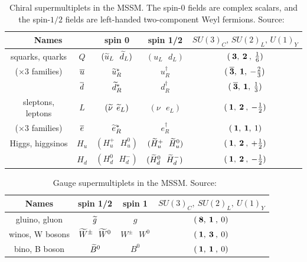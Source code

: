 \begin{table}[tb]
  \begin{center}
    \begin{tabular}{|c|c|c|c|c|}
      \hline
      \multicolumn{2}{|c|}{Names} 
      & spin 0 & spin 1/2 & $SU(3)_C ,\, SU(2)_L ,\, U(1)_Y$
      \\  \hline\hline
      squarks, quarks & $Q$ & $({\widetilde u}_L\>\>\>{\widetilde d}_L )$&
      $(u_L\>\>\>d_L)$ & $(\>{\bf 3},\>{\bf 2}\>,\>{1\over 6})$
      \\
      ($\times 3$ families) & $\overline u$
      &${\widetilde u}^*_R$ & $u^\dagger_R$ & 
      $(\>{\bf \overline 3},\> {\bf 1},\> -{2\over 3})$
      \\ & $\overline d$ &${\widetilde d}^*_R$ & $d^\dagger_R$ & 
      $(\>{\bf \overline 3},\> {\bf 1},\> {1\over 3})$
      \\  \hline
      sleptons, leptons & $L$ &$({\widetilde \nu}\>\>{\widetilde e}_L )$&
      $(\nu\>\>\>e_L)$ & $(\>{\bf 1},\>{\bf 2}\>,\>-{1\over 2})$
      \\
      ($\times 3$ families) & $\overline e$
      &${\widetilde e}^*_R$ & $e^\dagger_R$ & $(\>{\bf 1},\> {\bf 1},\>1)$
      \\  \hline
      Higgs, higgsinos &$H_u$ &$(H_u^+\>\>\>H_u^0 )$&
      $(\widetilde H_u^+ \>\>\> \widetilde H_u^0)$& 
      $(\>{\bf 1},\>{\bf 2}\>,\>+{1\over 2})$
      \\ &$H_d$ & $(H_d^0 \>\>\> H_d^-)$ & $(\widetilde H_d^0 \>\>\> \widetilde H_d^-)$& 
      $(\>{\bf 1},\>{\bf 2}\>,\>-{1\over 2})$
      \\  \hline
    \end{tabular}
    \caption[Chiral supermultiplets in the MSSM]{Chiral supermultiplets in the
    MSSM\@. The spin-$0$ fields are complex
    scalars, and the spin-$1/2$ fields are left-handed two-component Weyl
    fermions. Source:~\cite{Martin:1997um}\label{tab:chiral}} \vspace{-0.6cm}
  \end{center}
\end{table}
%
\renewcommand{\arraystretch}{1.55}
\begin{table}[t]
  \begin{center}
    \begin{tabular}{|c|c|c|c|}
      \hline
      Names & spin 1/2 & spin 1 & $SU(3)_C, \> SU(2)_L,\> U(1)_Y$\\
      \hline\hline
      gluino, gluon &$ \widetilde g$& $g$ & $(\>{\bf 8},\>{\bf 1}\>,\> 0)$
      \\
      \hline
      winos, W bosons & $ \widetilde W^\pm\>\>\> \widetilde W^0 $&
      $W^\pm\>\>\> W^0$ & $(\>{\bf 1},\>{\bf 3}\>,\> 0)$
      \\
      \hline
      bino, B boson &$\widetilde B^0$&
      $B^0$ & $(\>{\bf 1},\>{\bf 1}\>,\> 0)$
      \\
      \hline
    \end{tabular}
    \caption[Gauge supermultiplets in the MSSM]{Gauge supermultiplets in the
    MSSM\@. Source:~\cite{Martin:1997um}
    \label{tab:gauge}} \vspace{-0.45cm}
  \end{center}
\end{table}

